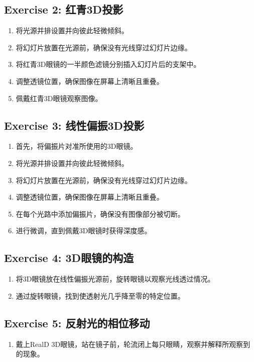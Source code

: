 \documentclass{ctexart}
\begin{document}
\subsection{Exercise 2: 红青3D投影}
\begin{enumerate}
    \item 将光源并排设置并向彼此轻微倾斜。
    \item 将幻灯片放置在光源前，确保没有光线穿过幻灯片边缘。
    \item 将红青3D眼镜的一半颜色滤镜分别插入幻灯片后的支架中。
    \item 调整透镜位置，确保图像在屏幕上清晰且重叠。
    \item 佩戴红青3D眼镜观察图像。
\end{enumerate}

\subsection{Exercise 3: 线性偏振3D投影}
\begin{enumerate}
    \item 首先，将偏振片对准所使用的3D眼镜。
    \item 将光源并排设置并向彼此轻微倾斜。
    \item 将幻灯片放置在光源前，确保没有光线穿过幻灯片边缘。
    \item 调整透镜位置，确保图像在屏幕上清晰且重叠。
    \item 在每个光路中添加偏振片，确保没有图像部分被切断。
    \item 进行微调，直到佩戴3D眼镜时获得深度感。
\end{enumerate}

\subsection{Exercise 4: 3D眼镜的构造}
\begin{enumerate}
    \item 将3D眼镜放在线性偏振光源前，旋转眼镜以观察光线透过情况。
    \item 通过旋转眼镜，找到使透射光几乎降至零的特定位置。
\end{enumerate}

\subsection{Exercise 5: 反射光的相位移动}
\begin{enumerate}
    \item 戴上RealD 3D眼镜，站在镜子前，轮流闭上每只眼睛，观察并解释所观察到的现象。
\end{enumerate}
\end{document}
